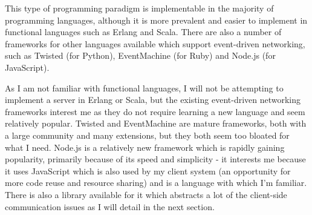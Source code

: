 \documentclass[a4papert,11pt,notitlepage]{ltxdoc}
\begin{document}
This type of programming paradigm is implementable in the majority of programming languages, although it is more prevalent and easier to implement in functional languages such as Erlang and Scala. There are also a number of frameworks for other languages available which support event-driven networking, such as Twisted (for Python), EventMachine (for Ruby) and Node.js (for JavaScript). 

As I am not familiar with functional languages, I will not be attempting to implement a server in Erlang or Scala, but the existing event-driven networking frameworks interest me as they do not require learning a new language and seem relatively popular. Twisted and EventMachine are mature frameworks, both with a large community and many extensions, but they both seem too bloated for what I need. Node.js is a relatively new framework which is rapidly gaining popularity, primarily because of its speed and simplicity - it interests me because it uses JavaScript which is also used by my client system (an opportunity for more code reuse and resource sharing) and is a language with which I'm familiar. There is also a library available for it which abstracts a lot of the client-side communication issues as I will detail in the next section.
\end{document}
